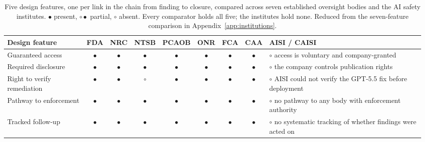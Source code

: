 \begin{table}[t]
\centering\small
\setlength{\tabcolsep}{5pt}
\renewcommand{\arraystretch}{1.2}
\begin{tabular}{@{}l ccccccc l@{}}
\toprule
\textbf{Design feature} & \textbf{FDA} & \textbf{NRC} & \textbf{NTSB} & \textbf{PCAOB} & \textbf{ONR} & \textbf{FCA} & \textbf{CAA} & \textbf{AISI / CAISI} \\
\midrule
Guaranteed access & $\bullet$ & $\bullet$ & $\bullet$ & $\bullet$ & $\bullet$ & $\bullet$ & $\bullet$ & $\circ$ \; \footnotesize access is voluntary and company-granted \\
Required disclosure & $\bullet$ & $\bullet$ & $\bullet$ & $\bullet$ & $\bullet$ & $\bullet$ & $\bullet$ & $\circ$ \; \footnotesize the company controls publication rights \\
Right to verify remediation & $\bullet$ & $\bullet$ & $\circ$ & $\bullet$ & $\bullet$ & $\bullet$ & $\bullet$ & $\circ$ \; \footnotesize AISI could not verify the GPT-5.5 fix before deployment \\
Pathway to enforcement & $\bullet$ & $\bullet$ & $\bullet$ & $\bullet$ & $\bullet$ & $\bullet$ & $\bullet$ & $\circ$ \; \footnotesize no pathway to any body with enforcement authority \\
Tracked follow-up & $\bullet$ & $\bullet$ & $\bullet$ & $\bullet$ & $\bullet$ & $\bullet$ & $\bullet$ & $\circ$ \; \footnotesize no systematic tracking of whether findings were acted on \\
\bottomrule
\end{tabular}
\caption{Five design features, one per link in the chain from finding to closure, compared across
seven established oversight bodies and the AI safety institutes. $\bullet$ present,
$\circ\!\!\!\bullet$ partial, $\circ$ absent. Every comparator holds all five; the institutes hold
none. Reduced from the seven-feature comparison in Appendix~\ref{app:institutions}.}
\label{tab:institutions}
\end{table}
